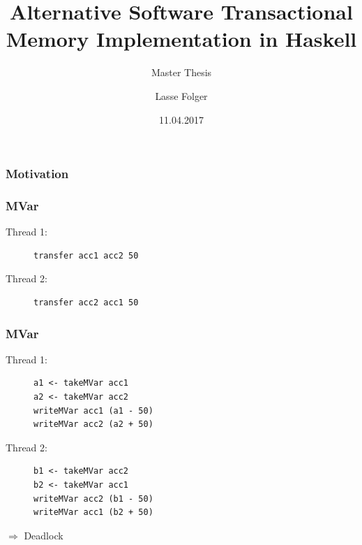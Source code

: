 \documentclass{beamer}
\author{Lasse Folger}
\title{\huge Alternative Software Transactional Memory Implementation in Haskell}
\subtitle{Master Thesis}
\date{11.04.2017}
\begin{document}
  \begin{frame}[t,plain]
    \titlepage
  \end{frame}
  
  
  \begin{frame}
    \frametitle{Motivation}
    
  \end{frame}
  
  \begin{frame}[fragile]
    \frametitle{MVar}
    \fboxsep=0pt
    \noindent
    \begin{minipage}[t]{0.48\linewidth}
      Thread 1:
            \begin{figure}
       \begin{lstlisting}[frame=single]
transfer acc1 acc2 50
       \end{lstlisting}
      \end{figure}
\end{minipage}%
    \hfill%
    \begin{minipage}[t]{0.48\linewidth}
      Thread 2:      
      \begin{figure}
       \begin{lstlisting}[frame=single]
transfer acc2 acc1 50
       \end{lstlisting}
      \end{figure}
    \end{minipage}
\end{frame}

  \begin{frame}[fragile]
    \frametitle{MVar}
    \fboxsep=0pt
    \noindent
    \begin{minipage}[t]{0.48\linewidth}
      Thread 1:
            \begin{figure}
       \begin{lstlisting}[frame=single]
a1 <- takeMVar acc1 
a2 <- takeMVar acc2 
writeMVar acc1 (a1 - 50)
writeMVar acc2 (a2 + 50)
       \end{lstlisting}
      \end{figure}
\end{minipage}%
    \hfill%
    \begin{minipage}[t]{0.48\linewidth}
      Thread 2:      
      \begin{figure}
       \begin{lstlisting}[frame=single]
b1 <- takeMVar acc2 
b2 <- takeMVar acc1 
writeMVar acc2 (b1 - 50)
writeMVar acc1 (b2 + 50)
       \end{lstlisting}
      \end{figure}
    \end{minipage}
    \vfill
    \pause
    $\Rightarrow$ Deadlock
\end{frame}
  
\end{document}
